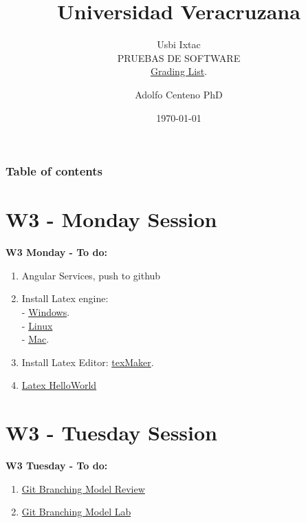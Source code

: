 \documentclass{beamer}
\begin{document}
\title{Universidad Veracruzana}  
\subtitle{Usbi Ixtac\\PRUEBAS DE SOFTWARE\\\href{https://drive.google.com/file/d/1x-8DA-Xe7fQfKMPQY9XWx86y6o0Z-NRR/view?usp=sharing}{Grading List}.
}
\author{Adolfo Centeno PhD}
\date{\today} 


\begin{frame}
\titlepage
\end{frame}

\begin{frame}\frametitle{Table of contents}
\tableofcontents
\end{frame} 


\section{W3 - Monday Session  }

\begin{frame}

\textbf{W3 Monday - To do:}

\begin{enumerate}
\item
	Angular Services, push to github 
\item
    Install Latex engine:  \\
    - \href{https://miktex.org/download}{Windows}. \\
    - \href{https://dzone.com/articles/installing-latex-ubuntu}{Linux} \\
    - \href{http://www.tug.org/mactex/mactex-download.html}{Mac}. 
\item
	Install Latex Editor: \href{https://www.xm1math.net/texmaker/download.html}{texMaker}.	
\item
	\href{https://github.com/adsoftsito/tdd/blob/master/w3/helloworld.tex}{Latex HelloWorld} 

	

\end{enumerate} 

\end{frame}


\section{W3 - Tuesday Session }

\begin{frame}

\textbf{W3 Tuesday - To do:}

\begin{enumerate}
\item
	\href{https://github.com/adsoftsito/tdd/blob/master/w3/helloworld.tex}{Git Branching Model Review} 

\item
	\href{https://github.com/adsoftsito/tdd/blob/master/w3/helloworld.tex}{Git Branching Model Lab} 

\end{enumerate} 

\end{frame}
\end{document}
